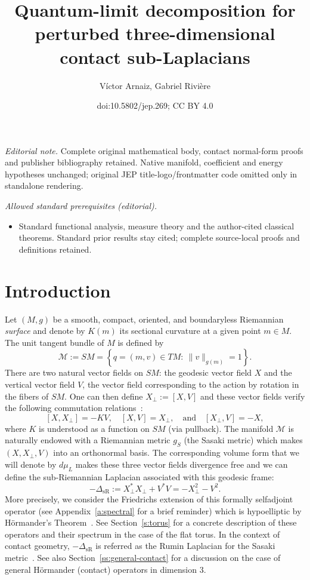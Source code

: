 \documentclass[10pt]{amsart}
\title{Quantum-limit decomposition for perturbed three-dimensional contact sub-Laplacians}
\author{Víctor Arnaiz, Gabriel Rivière}
\date{doi:10.5802/jep.269; CC BY 4.0}
\theoremstyle{plain}
\theoremstyle{definition}
\theoremstyle{remark}
\begin{document}
\maketitle
\noindent\textit{Editorial note.} Complete original mathematical body, contact normal-form proofs and publisher bibliography retained. Native manifold, coefficient and energy hypotheses unchanged; original JEP title-logo/frontmatter code omitted only in standalone rendering.\par\medskip
\noindent\textit{Allowed standard prerequisites (editorial).}\begin{itemize}
\item Standard functional analysis, measure theory and the author-cited classical theorems. Standard prior results stay cited; complete source-local proofs and definitions retained.
\end{itemize}\medskip
\vspace*{-\baselineskip}
\tableofcontents


\section{Introduction}

Let $(M,g)$ be a smooth, compact, oriented, and boundaryless Riemannian \emph{surface} and denote by $K(m)$ its sectional curvature at a given point $m\in M$. The unit tangent bundle of $M$ is defined by
\[
\mathcal{M}:=SM=\left\{q=(m,v)\in TM:\ \|v\|_{g(m)}=1\right\}.
\]
There are two natural vector fields on $SM$: the geodesic vector field $X$ and the vertical vector field $V$, \ie  the vector field corresponding to the action by rotation in the fibers of $SM$. One can then define $X_\perp:=[X,V]$ and these vector fields verify the following commutation relations~\cite[\S3.5.1]{PaternainSaloUhlmann22}:
\begin{equation}\label{e:commutators}
[X,X_\perp]= -KV,\quad [X,V]=X_\perp,\quad\text{and}\quad [X_\perp,V]=-X,
\end{equation}
where $K$ is understood as a function on $SM$ (via pullback). The manifold $\mathcal{M}$ is naturally endowed with a Riemannian metric $g_S$ (the Sasaki metric) which makes $(X,X_\perp,V)$ into an orthonormal basis. The corresponding volume form that we will denote by $d\mu_L$ makes these three vector fields divergence free and we can define the sub-Riemannian Laplacian associated with this geodesic frame:\enlargethispage{-\baselineskip}
\[
-\Delta_{\text{sR}}:=X_\perp^*X_\perp+V^*V=-X_\perp^2-V^2.
\]
More precisely, we consider the Friedrichs extension of this formally selfadjoint opera\-tor (see Appendix~\ref{a:spectral} for a brief reminder) which is hypoelliptic by Hörmander's Theorem~\cite[Th.\,1.1]{Hormander67}. See Section~\ref{s:torus} for a concrete description of these operators and their spectrum in the case of the flat torus. In the context of contact geometry, $-\Delta_{\text{sR}}$ is referred as the Rumin Laplacian for the Sasaki metric~\cite{Rumin1994}. See also Section~\ref{ss:general-contact} for a discussion on the case of general Hörmander (contact) operators in dimension $3$.
\end{document}
